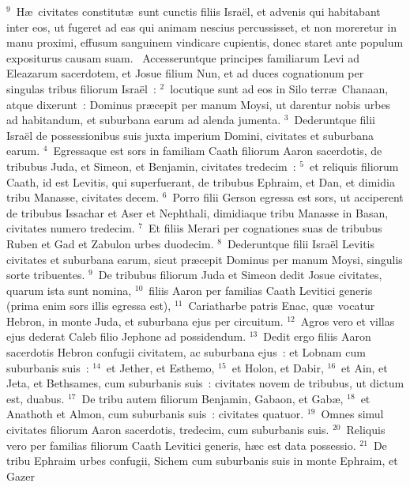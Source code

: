 ${}^{9}$~H\ae\ civitates constitut\ae\ sunt cunctis filiis Isra\"el, et advenis qui habitabant inter eos, ut fugeret ad eas qui animam nescius percussisset, et non moreretur in manu proximi, effusum sanguinem vindicare cupientis, donec staret ante populum expositurus causam suam.
~\lettrine[lines=10,image=true,loversize=0.05,lraise=-0.03]{A}{}ccesseruntque principes familiarum Levi ad Eleazarum sacerdotem, et Josue filium Nun, et ad duces cognationum per singulas tribus filiorum Isra\"el~:
${}^{2}$~locutique sunt ad eos in Silo terr\ae\ Chanaan, atque dixerunt~: Dominus pr\ae cepit per manum Moysi, ut darentur nobis urbes ad habitandum, et suburbana earum ad alenda jumenta.
${}^{3}$~Dederuntque filii Isra\"el de possessionibus suis juxta imperium Domini, civitates et suburbana earum.
${}^{4}$~Egressaque est sors in familiam Caath filiorum Aaron sacerdotis, de tribubus Juda, et Simeon, et Benjamin, civitates tredecim~:
${}^{5}$~et reliquis filiorum Caath, id est Levitis, qui superfuerant, de tribubus Ephraim, et Dan, et dimidia tribu Manasse, civitates decem.
${}^{6}$~Porro filii Gerson egressa est sors, ut acciperent de tribubus Issachar et Aser et Nephthali, dimidiaque tribu Manasse in Basan, civitates numero tredecim.
${}^{7}$~Et filiis Merari per cognationes suas de tribubus Ruben et Gad et Zabulon urbes duodecim.
${}^{8}$~Dederuntque filii Isra\"el Levitis civitates et suburbana earum, sicut pr\ae cepit Dominus per manum Moysi, singulis sorte tribuentes.
${}^{9}$~De tribubus filiorum Juda et Simeon dedit Josue civitates, quarum ista sunt nomina,
${}^{10}$~filiis Aaron per familias Caath Levitici generis (prima enim sors illis egressa est),
${}^{11}$~Cariatharbe patris Enac, qu\ae\ vocatur Hebron, in monte Juda, et suburbana ejus per circuitum.
${}^{12}$~Agros vero et villas ejus dederat Caleb filio Jephone ad possidendum.
${}^{13}$~Dedit ergo filiis Aaron sacerdotis Hebron confugii civitatem, ac suburbana ejus~: et Lobnam cum suburbanis suis~:
${}^{14}$~et Jether, et Esthemo,
${}^{15}$~et Holon, et Dabir,
${}^{16}$~et Ain, et Jeta, et Bethsames, cum suburbanis suis~: civitates novem de tribubus, ut dictum est, duabus.
${}^{17}$~De tribu autem filiorum Benjamin, Gabaon, et Gab\ae ,
${}^{18}$~et Anathoth et Almon, cum suburbanis suis~: civitates quatuor.
${}^{19}$~Omnes simul civitates filiorum Aaron sacerdotis, tredecim, cum suburbanis suis.
${}^{20}$~Reliquis vero per familias filiorum Caath Levitici generis, h\ae c est data possessio.
${}^{21}$~De tribu Ephraim urbes confugii, Sichem cum suburbanis suis in monte Ephraim, et Gazer
